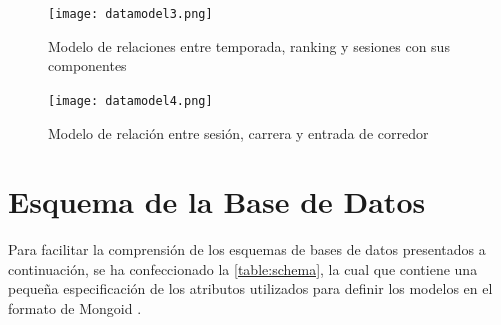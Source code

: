 \begin{figure}[H]
  \begin{center}
    \texttt{[image: datamodel3.png]}
  \end{center}
  \caption[Modelo de relaciones entre temporada, ranking y sesiones con sus componentes]{Modelo de relaciones entre temporada, ranking y sesiones con sus componentes}
  \label{fig:datamodels3}
\end{figure}

\begin{figure}[H]
  \begin{center}
    \texttt{[image: datamodel4.png]}
  \end{center}
  \caption[Modelo de relación entre sesión, carrera y entrada de corredor]{Modelo de relación entre sesión, carrera y entrada de corredor}
  \label{fig:datamodels4}
\end{figure}

\newpage

\section{Esquema de la Base de Datos}
Para facilitar la comprensión de los esquemas de bases de datos presentados a continuación, se ha confeccionado la \autoref{table:schema}, la cual que contiene una pequeña especificación de los atributos utilizados para definir los modelos en el formato de Mongoid \cite{mongoid}.

